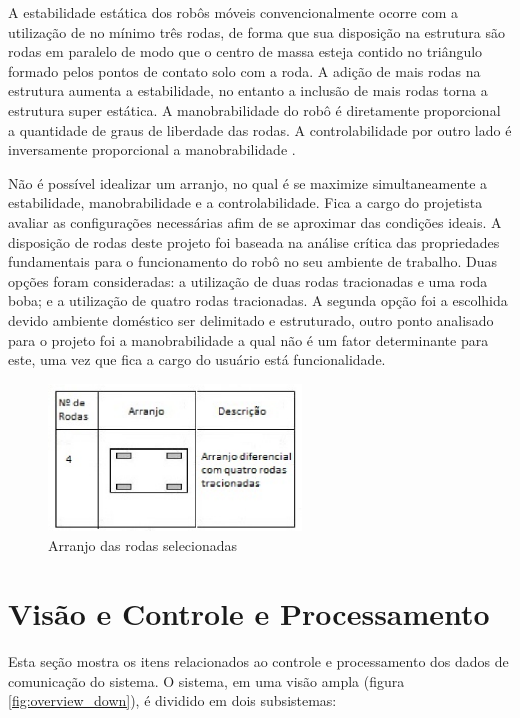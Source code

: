 A estabilidade estática dos robôs móveis convencionalmente ocorre com a utilização de no mínimo três rodas, de forma que sua disposição
na estrutura são rodas em paralelo de modo que o centro de massa esteja contido no triângulo formado pelos pontos de contato solo com a
roda. A adição de mais rodas na estrutura aumenta a estabilidade, no entanto a inclusão de mais rodas torna a estrutura super estática.
A manobrabilidade do robô é diretamente proporcional a quantidade de graus de liberdade das rodas. A controlabilidade por outro lado é
inversamente proporcional a manobrabilidade \cite{braga:2014}.

Não é possível idealizar um arranjo, no qual é se maximize simultaneamente a estabilidade, manobrabilidade e a controlabilidade.
Fica a cargo do projetista avaliar as configurações necessárias afim de se aproximar das condições ideais. A disposição de rodas deste
projeto foi baseada na análise crítica das propriedades fundamentais para o funcionamento do robô no seu ambiente de trabalho. Duas opções
foram consideradas: a utilização de duas rodas tracionadas e uma roda boba; e a utilização de quatro rodas tracionadas. A segunda opção foi
a escolhida devido ambiente doméstico ser delimitado e estruturado, outro ponto analisado para o projeto foi a manobrabilidade a qual não
é um fator determinante para este, uma vez que fica a cargo do usuário está funcionalidade.

\begin{figure}[H]
    \centering
    \includegraphics[width=0.6\textwidth]{figuras/arranjo.eps}
    \caption{Arranjo das rodas selecionadas}
    \label{fig:arranjo}
\end{figure}


\section{Visão e Controle e Processamento}

Esta seção mostra os itens relacionados ao controle e processamento dos dados de comunicação do sistema. O sistema, em uma visão ampla
(figura \ref{fig:overview_down}), é dividido em dois subsistemas:

